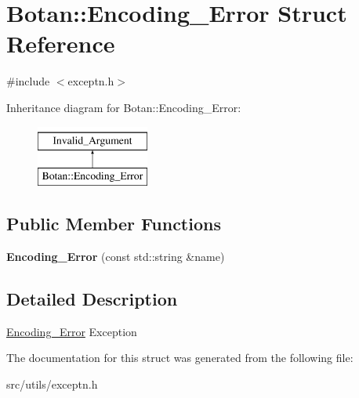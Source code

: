 \hypertarget{structBotan_1_1Encoding__Error}{\section{Botan\-:\-:Encoding\-\_\-\-Error Struct Reference}
\label{structBotan_1_1Encoding__Error}
}


{\ttfamily \#include $<$exceptn.\-h$>$}

Inheritance diagram for Botan\-:\-:Encoding\-\_\-\-Error\-:\begin{figure}[H]
\begin{center}
\leavevmode
\includegraphics[height=2.000000cm]{structBotan_1_1Encoding__Error}
\end{center}
\end{figure}
\subsection*{Public Member Functions}
\begin{DoxyCompactItemize}
\item 
\hypertarget{structBotan_1_1Encoding__Error_a156d7f20c3f12d304215f10b9f3ed0b5}{{\bfseries Encoding\-\_\-\-Error} (const std\-::string \&name)}\label{structBotan_1_1Encoding__Error_a156d7f20c3f12d304215f10b9f3ed0b5}

\end{DoxyCompactItemize}


\subsection{Detailed Description}
\hyperlink{structBotan_1_1Encoding__Error}{Encoding\-\_\-\-Error} Exception 

The documentation for this struct was generated from the following file\-:\begin{DoxyCompactItemize}
\item 
src/utils/exceptn.\-h\end{DoxyCompactItemize}
